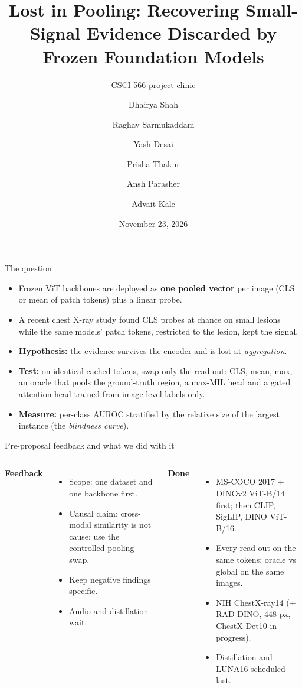 \documentclass[10pt,aspectratio=169]{beamer}
\title{Lost in Pooling: Recovering Small-Signal Evidence Discarded by Frozen Foundation Models}
\subtitle{CSCI 566 project clinic}
\author{Dhairya Shah \and Raghav Sarmukaddam \and Yash Desai \and Prisha Thakur \and Ansh Parasher \and Advait Kale}
\institute{University of Southern California}
\date{November 23, 2026}
\begin{document}
\frame{\titlepage}

\begin{frame}{The question}
\begin{itemize}
\item Frozen ViT backbones are deployed as \textbf{one pooled vector} per image (CLS or mean of patch tokens) plus a linear probe.
\item A recent chest X-ray study found CLS probes at chance on small lesions while the same models' patch tokens, restricted to the lesion, kept the signal.
\item \textbf{Hypothesis:} the evidence survives the encoder and is lost at \emph{aggregation}.
\item \textbf{Test:} on identical cached tokens, swap only the read-out: CLS, mean, max, an oracle that pools the ground-truth region, a max-MIL head and a gated attention head trained from image-level labels only.
\item \textbf{Measure:} per-class AUROC stratified by the relative size of the largest instance (the \emph{blindness curve}).
\end{itemize}
\end{frame}

\begin{frame}{Pre-proposal feedback and what we did with it}
\begin{columns}
\textbf{Feedback}
\begin{itemize}
\item Scope: one dataset and one backbone first.
\item Causal claim: cross-modal similarity is not cause; use the controlled pooling swap.
\item Keep negative findings specific.
\item Audio and distillation wait.
\end{itemize}
\textbf{Done}
\begin{itemize}
\item MS-COCO 2017 + DINOv2 ViT-B/14 first; then CLIP, SigLIP, DINO ViT-B/16.
\item Every read-out on the same tokens; oracle vs global on the same images.
\item NIH ChestX-ray14 (+ RAD-DINO, 448 px, ChestX-Det10 in progress).
\item Distillation and LUNA16 scheduled last.
\end{itemize}
\end{columns}
\end{frame}
\end{document}
